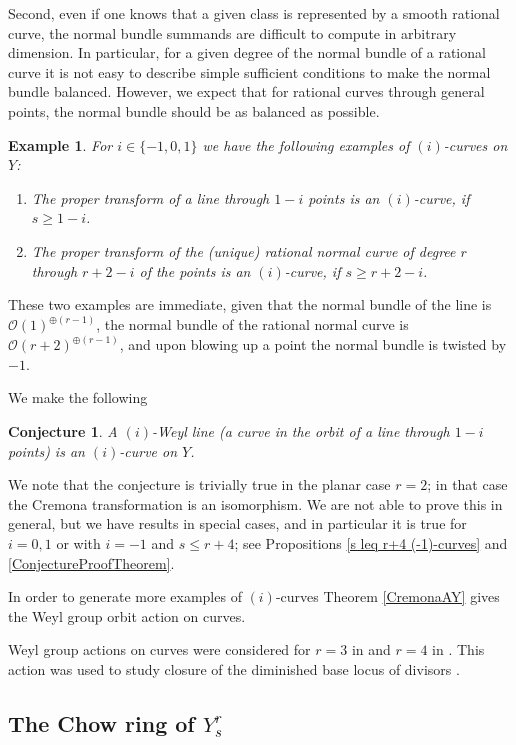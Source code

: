 \documentclass[12pt]{article}
\newtheorem{conjecture}[equation]{Conjecture}
\newtheorem{example}[equation]{Example}
\numberwithin{equation}{section}
\numberwithin{subeq}{equation}
\def\calO{\mathcal{O}}
\begin{document}
Second, even if one knows that a given class is represented by a smooth rational curve,
the normal bundle summands are difficult to compute in arbitrary dimension.
In particular, for a given degree of the normal bundle of a rational curve
it is not easy to describe simple sufficient conditions to make the normal bundle balanced.
However, we expect that for rational curves through general points,
the normal bundle should be as balanced as possible.

\begin{example}\label{line} For $i\in \{-1,0,1\}$ we have the following examples
of $(i)$-curves on $Y$:
\begin{enumerate}
\item The proper transform of a line through $1-i$ points is an $(i)$-curve, if $s \geq 1-i$.
\item The proper transform of the (unique) rational normal curve of degree $r$
through $r+2-i$ of the points is an $(i)$-curve, if $s \geq r+2-i$.
\end{enumerate}
\end{example}

These two examples are immediate,
given that the normal bundle of the line is $\calO(1)^{\oplus(r-1)}$,
the normal bundle of the rational normal curve is $\calO(r+2)^{\oplus(r-1)}$,
and upon blowing up a point the normal bundle is twisted by $-1$.

We make the following
\begin{conjecture}\label{HardConjecture}
A $(i)$-Weyl line
(a curve in the orbit of a line through $1-i$ points)
is an $(i)$-curve on $Y$.
\end{conjecture}

We note that the conjecture is trivially true in the planar case $r=2$;
in that case the Cremona transformation is an isomorphism.
We are not able to prove this in general, but we have results in special cases,
and in particular it is true for $i =0, 1$ or with $i=-1$ and $s \leq r+4$;
see Propositions \ref{s leq r+4 (-1)-curves} and \ref{ConjectureProofTheorem}.

In order to generate more examples of $(i)$-curves Theorem \ref{CremonaAY} gives the Weyl group orbit action on curves.

Weyl group actions on curves were considered for $r=3$ in \cite{LU} and $r=4$ in \cite{DM1}.
This action was used to study closure of the diminished base locus of divisors \cite{L}.

\subsection{The Chow ring of $Y^r_s$}
\end{document}
